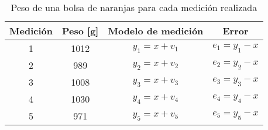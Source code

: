 \begin{table}[]
\centering
\begin{tabular}{c|c|c|c}
\textbf{Medición} & \textbf{Peso {[}g{]}} & \textbf{Modelo de medición} & \textbf{Error} \\ \hline
1                       & 1012                  & $y_1 = x + v_1$        & $e_1 = y_1 - x$      \\ \hline
2                       & 989                   & $y_2 = x + v_2$        & $e_2 = y_2 - x$      \\ \hline
3                       & 1008                  & $y_3 = x + v_3$        & $e_3 = y_3 - x$      \\ \hline
4                       & 1030                  & $y_4 = x + v_4$        & $e_4 = y_4 - x$      \\ \hline
5                       & 971                   & $y_5 = x + v_5$        & $e_5 = y_5 - x$           
\end{tabular}
\caption{Peso de una bolsa de naranjas para cada medición realizada}
\label{tab:naranjasbalanza}
\end{table}